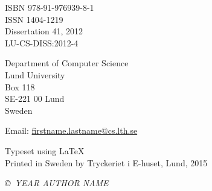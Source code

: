 \documentclass[a4paper, 10pt, twoside, openright]{book}
\begin{document}
\frontmatter

\begin{titlepage}

\thispagestyle{empty}


\begin{flushleft}


ISBN 978-91-976939-8-1\\
ISSN 1404-1219\\
Dissertation 41, 2012\\
LU-CS-DISS:2012-4\linebreak[2]

Department of Computer Science \\
Lund University \\
Box 118 \\
SE-221 00  Lund \\
Sweden  \linebreak[2]

Email: \url{firstname.lastname@cs.lth.se} \linebreak[2]

Typeset using \LaTeX \\ 

Printed in Sweden by Tryckeriet i E-huset, Lund, 2015\linebreak[2]

\textit{\copyright ~YEAR AUTHOR NAME}
\vspace{10mm}
\end{flushleft}
\end{titlepage}



\newcommand{\Matlab}{\textsc{MatLab}\xspace}



%

\setcounter{tocdepth}{1}
\tableofcontents

%

%

\mainmatter
\renewcommand{\thesection}{\arabic{section}}
\renewcommand{\thefigure}{\arabic{figure}}
\renewcommand{\thetable}{\arabic{table}}
\renewcommand{\thechapter}{\Roman{chapter}}
\renewcommand{\theequation}{\arabic{equation}}
\end{document}
